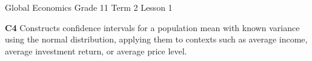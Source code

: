 \newcommand{\criterionbox}[2]{%
    \begin{tcolorbox}[colback=white,colframe=black!45,boxrule=.4pt,
        arc=2mm,boxsep=0pt,left=6pt,right=6pt,top=5pt,bottom=5pt,
        before skip=4pt,after skip=4pt,width=\linewidth]
        \textbf{#1} #2
    \end{tcolorbox}%
}
\newcommand{\problemtitle}[3]{%
    \par\Needspace{4\baselineskip}\addvspace{0.4\baselineskip}%
    \noindent
    {\begin{varwidth}[t]{0.75\linewidth}%
         \bfseries\strut #1. #2%
     \end{varwidth}}%
    \hfill\textbf{#3}\par\nopagebreak[4]
}
\newcommand{\taskheading}[1]{%
    \par\Needspace{5\baselineskip}\addvspace{4pt}%
    \noindent\tikz[baseline=(title.base)]{%
        \node[fill=black!5,draw=none,text=black,rounded corners=2mm,
            inner sep=3pt,outer sep=0pt] (title) {%
            \begin{varwidth}{\dimexpr\linewidth-6pt\relax}%
                \raggedright\bfseries\strut #1\strut
            \end{varwidth}};}\par\nopagebreak[4]\smallskip
}
\newcommand{\task}[2]{\taskheading{#1}#2}
\newcommand{\subtaskheading}[2]{%
    \par\Needspace{4\baselineskip}\addvspace{4pt}%
    \noindent{\color{black}\textbf{\underline{#1. #2.}}}\par
    \nopagebreak[4]\smallskip
}


{
Global Economics \textbar{} Grade 11 \textbar{} Term 2 \textbar{} Lesson 1\par}
\criterionbox{C4}{Constructs confidence intervals for a population mean with known variance using the normal distribution, applying them to contexts such as average income, average investment return, or average price level.}

